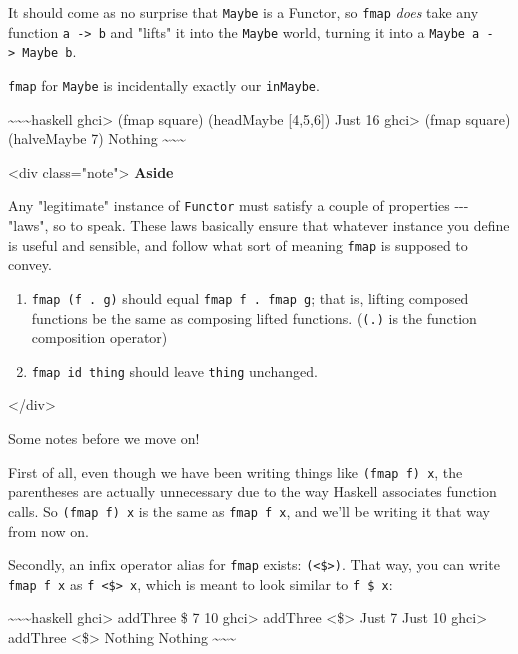 \documentclass[]{article}
\begin{document}
It should come as no surprise that \texttt{Maybe} is a Functor, so \texttt{fmap}
\emph{does} take any function \texttt{a\ -\textgreater{}\ b} and "lifts" it into
the \texttt{Maybe} world, turning it into a
\texttt{Maybe\ a\ -\textgreater{}\ Maybe\ b}.

\texttt{fmap} for \texttt{Maybe} is incidentally exactly our \texttt{inMaybe}.

\textasciitilde{}\textasciitilde{}\textasciitilde{}haskell ghci\textgreater{}
(fmap square) (headMaybe {[}4,5,6{]}) Just 16 ghci\textgreater{} (fmap square)
(halveMaybe 7) Nothing \textasciitilde{}\textasciitilde{}\textasciitilde{}

\textless{}div class="note"\textgreater{} \textbf{Aside}

Any "legitimate" instance of \texttt{Functor} must satisfy a couple of
properties -\/-\/- "laws", so to speak. These laws basically ensure that
whatever instance you define is useful and sensible, and follow what sort of
meaning \texttt{fmap} is supposed to convey.

\begin{enumerate}
\tightlist
\item
  \texttt{fmap\ (f\ .\ g)} should equal \texttt{fmap\ f\ .\ fmap\ g}; that is,
  lifting composed functions be the same as composing lifted functions.
  (\texttt{(.)} is the function composition operator)
\item
  \texttt{fmap\ id\ thing} should leave \texttt{thing} unchanged.
\end{enumerate}

\textless{}/div\textgreater{}

Some notes before we move on!

First of all, even though we have been writing things like
\texttt{(fmap\ f)\ x}, the parentheses are actually unnecessary due to the way
Haskell associates function calls. So \texttt{(fmap\ f)\ x} is the same as
\texttt{fmap\ f\ x}, and we'll be writing it that way from now on.

Secondly, an infix operator alias for \texttt{fmap} exists:
\texttt{(\textless{}\$\textgreater{})}. That way, you can write
\texttt{fmap\ f\ x} as \texttt{f\ \textless{}\$\textgreater{}\ x}, which is
meant to look similar to \texttt{f\ \$\ x}:

\textasciitilde{}\textasciitilde{}\textasciitilde{}haskell ghci\textgreater{}
addThree \$ 7 10 ghci\textgreater{} addThree \textless{}\$\textgreater{} Just 7
Just 10 ghci\textgreater{} addThree \textless{}\$\textgreater{} Nothing Nothing
\textasciitilde{}\textasciitilde{}\textasciitilde{}
\end{document}
